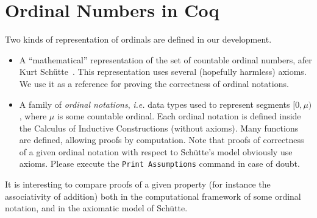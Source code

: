 \section{Ordinal Numbers in Coq}

Two kinds of representation of ordinals are defined in our development.

\begin{itemize}
\item A ``mathematical'' representation of the set of countable ordinal numbers, afer Kurt Schütte~\cite{schutte}. This representation uses several (hopefully harmless) axioms. We use it as a reference for proving the correctness of ordinal notations.
\item A family of \emph{ordinal notations}, \emph{i.e.} data types used to represent segments $[0,\mu)$, where $\mu$ is some countable ordinal. Each ordinal notation is defined inside the Calculus of Inductive Constructions (without axioms). Many functions are defined, allowing proofs by computation. Note that proofs of 
correctness of a given ordinal notation with respect to Schütte's model obviously use axioms.
Please execute the \texttt{Print Assumptions} command in case of doubt.
\end{itemize}





It is interesting to compare proofs of a given property (for instance the associativity of addition) both in the computational framework of some ordinal notation, and in the axiomatic model of Schütte.

